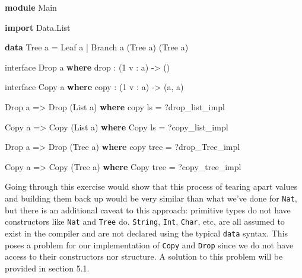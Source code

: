 \documentclass[
]{article}
\newenvironment{Shaded}{}{}
\newcommand{\DataTypeTok}[1]{\textcolor[rgb]{0.56,0.13,0.00}{#1}}
\newcommand{\DecValTok}[1]{\textcolor[rgb]{0.25,0.63,0.44}{#1}}
\newcommand{\FunctionTok}[1]{\textcolor[rgb]{0.02,0.16,0.49}{#1}}
\newcommand{\KeywordTok}[1]{\textcolor[rgb]{0.00,0.44,0.13}{\textbf{#1}}}
\newcommand{\NormalTok}[1]{#1}
\newcommand{\OperatorTok}[1]{\textcolor[rgb]{0.40,0.40,0.40}{#1}}
\newcommand{\OtherTok}[1]{\textcolor[rgb]{0.00,0.44,0.13}{#1}}
\begin{document}
\begin{Shaded}
\begin{Highlighting}[]
\KeywordTok{module} \DataTypeTok{Main}

\KeywordTok{import} \DataTypeTok{Data.List}

\KeywordTok{data} \DataTypeTok{Tree}\NormalTok{ a }\OtherTok{=} \DataTypeTok{Leaf}\NormalTok{ a }\OperatorTok{|} \DataTypeTok{Branch}\NormalTok{ a (}\DataTypeTok{Tree}\NormalTok{ a) (}\DataTypeTok{Tree}\NormalTok{ a)}

\NormalTok{interface }\DataTypeTok{Drop}\NormalTok{ a }\KeywordTok{where}
    \FunctionTok{drop} \OperatorTok{:}\NormalTok{ (}\DecValTok{1}\NormalTok{ v }\OperatorTok{:}\NormalTok{ a) }\OtherTok{{-}\textgreater{}}\NormalTok{ ()}

\NormalTok{interface }\DataTypeTok{Copy}\NormalTok{ a }\KeywordTok{where}
\NormalTok{    copy }\OperatorTok{:}\NormalTok{ (}\DecValTok{1}\NormalTok{ v }\OperatorTok{:}\NormalTok{ a) }\OtherTok{{-}\textgreater{}}\NormalTok{ (a, a)}

\DataTypeTok{Drop}\NormalTok{ a }\OtherTok{=\textgreater{}} \DataTypeTok{Drop}\NormalTok{ (}\DataTypeTok{List}\NormalTok{ a) }\KeywordTok{where}
\NormalTok{    copy ls }\OtherTok{=} \OperatorTok{?}\NormalTok{drop\_list\_impl}

\DataTypeTok{Copy}\NormalTok{ a }\OtherTok{=\textgreater{}} \DataTypeTok{Copy}\NormalTok{ (}\DataTypeTok{List}\NormalTok{ a) }\KeywordTok{where}
    \DataTypeTok{Copy}\NormalTok{ ls }\OtherTok{=} \OperatorTok{?}\NormalTok{copy\_list\_impl}

\DataTypeTok{Drop}\NormalTok{ a }\OtherTok{=\textgreater{}} \DataTypeTok{Drop}\NormalTok{ (}\DataTypeTok{Tree}\NormalTok{ a) }\KeywordTok{where}
\NormalTok{    copy tree }\OtherTok{=} \OperatorTok{?}\NormalTok{drop\_Tree\_impl}

\DataTypeTok{Copy}\NormalTok{ a }\OtherTok{=\textgreater{}} \DataTypeTok{Copy}\NormalTok{ (}\DataTypeTok{Tree}\NormalTok{ a) }\KeywordTok{where}
    \DataTypeTok{Copy}\NormalTok{ tree }\OtherTok{=} \OperatorTok{?}\NormalTok{copy\_tree\_impl}
\end{Highlighting}
\end{Shaded}

Going through this exercise would show that this process of tearing
apart values and building them back up would be very similar than what
we've done for \texttt{Nat}, but there is an additional caveat to this
approach: primitive types do not have constructors like \texttt{Nat} and
\texttt{Tree} do. \texttt{String}, \texttt{Int}, \texttt{Char}, etc, are
all assumed to exist in the compiler and are not declared using the
typical \texttt{data} syntax. This poses a problem for our
implementation of \texttt{Copy} and \texttt{Drop} since we do not have
access to their constructors nor structure. A solution to this problem
will be provided in section 5.1.
\end{document}
